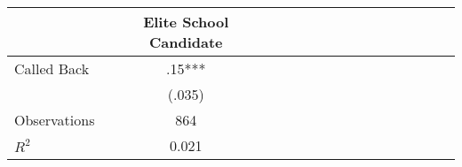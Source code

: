 \begin{tabular}{l*{14}{c}}
                    &\multicolumn{1}{c}{Elite School Candidate}\\
\hline
Called Back         &         .15***\\
                    &      (.035)   \\
\hline
Observations        &         864   \\
\(R^{2}\)           &       0.021   \\
\end{tabular}
